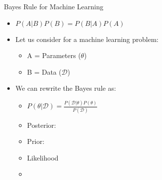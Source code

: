 \documentclass{beamer}
\begin{document}
\begin{frame}{Bayes Rule for Machine Learning}
\begin{itemize}


    \item $P(A|B)P(B) = P(B|A)P(A)$
    \item Let us consider for a machine learning problem:
    \begin{itemize}
    	\item A = Parameters ($\theta$)
    	\item B = Data ($\mathcal{D}$)
    \end{itemize}
\item We can rewrite the Bayes rule as:
\begin{itemize}
	\item $P(\theta|\mathcal{D}) = \frac{P(\mathcal{D}|\theta)P(\theta)}{P(\mathcal{D})}$
	\item Posterior: 
	\item Prior:
	\item Likelihood
	\item 
\end{itemize}
\end{itemize}
\end{frame}
\end{document}
